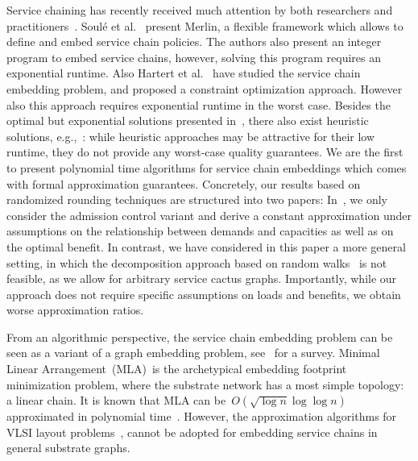 \documentclass[10pt, conference, letterpaper]{IEEEtran}
\begin{document}
Service chaining
has recently received much attention by
both researchers and practitioners~\cite{karl-chains,ewsdn14,stefano-sigc,merlin}. 
Soul\'{e} et al.~\cite{merlin} present Merlin,
a flexible framework which allows
to define and embed service chain policies.
The authors also present an integer program
to embed service chains, however, solving
this program requires an exponential runtime. 
Also
Hartert et al.~\cite{stefano-sigc} have studied
the service chain embedding problem,
and proposed a constraint optimization
approach. However also this approach
requires exponential runtime in the worst case.
Besides the optimal but exponential
solutions presented in~\cite{stefano-sigc,merlin}, 
there also exist heuristic solutions, e.g.,~\cite{karl-chains,ewsdn14}:
while heuristic approaches may be attractive for their
low runtime, they do not provide any
worst-case quality guarantees. 
We are the first to present
polynomial time algorithms for service chain embeddings
which comes with formal approximation guarantees.
Concretely, our results based on randomized rounding techniques
are structured into two papers:
In~\cite{swat-guy}, we only consider the admission control variant
and derive a constant approximation under assumptions on the relationship
between demands and capacities as well as on the optimal benefit.
In contrast, we have considered in this paper a more general
setting, in which the decomposition approach based on random walks~\cite{swat-guy}
 is not feasible, as we allow for arbitrary service cactus graphs.
Importantly, while our approach does not require specific assumptions on loads and benefits, we obtain
worse approximation ratios. 

From an algorithmic perspective, 
the service chain embedding problem
can be seen as a variant of  a
graph embedding problem, see~\cite{diaz2002survey} for a survey.
Minimal Linear Arrangement~(MLA)~is the archetypical
embedding footprint minimization problem,
where the substrate network has a most simple topology:
a linear chain.
It is known that MLA can be~$O(\sqrt{\log{n}}\log\log{n})$ approximated in
polynomial time~\cite{best-mla-1,mla-best-2}.
However, the approximation algorithms 
for VLSI layout problems~\cite{diaz2002survey,vlsi-layout},
cannot be adopted for embedding service chains in 
general substrate graphs.
\end{document}
